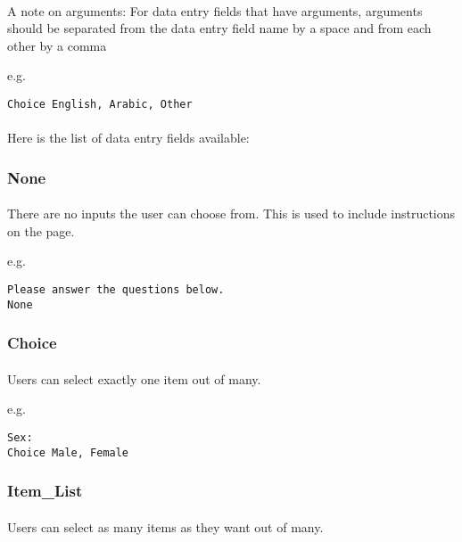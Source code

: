 \paragraph{}
A note on arguments: For data entry fields that have arguments, arguments should be separated from the data entry field name by a space and from each other by a comma 

e.g.

\begin{lstlisting}
Choice English, Arabic, Other
\end{lstlisting}

\paragraph{}
Here is the list of data entry fields available:

\subsubsection{None}

\paragraph{}
There are no inputs the user can choose from.  This is used to include instructions on the page.

e.g.

\begin{lstlisting}
Please answer the questions below.
None
\end{lstlisting}

\subsubsection{Choice}

\paragraph{}
Users can select exactly one item out of many.

e.g.

\begin{lstlisting}
Sex:
Choice Male, Female
\end{lstlisting}

\subsubsection{Item\_List}

\paragraph{}
Users can select as many items as they want out of many.

